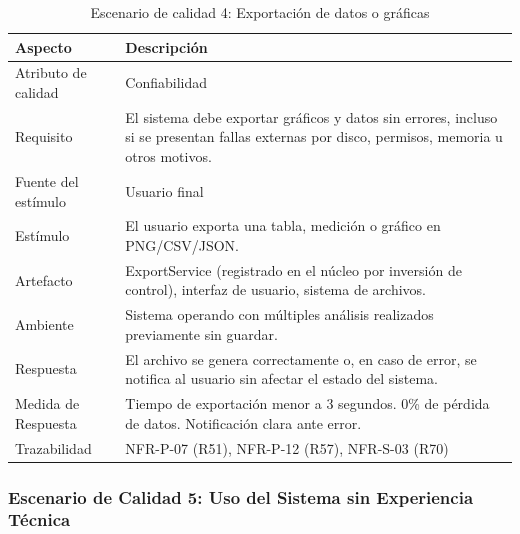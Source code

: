 \documentclass[11pt,a4paper]{article}
\DeclareRobustCommand{\_}{\textunderscore\allowbreak}
\begin{document}
\begin{table}[H]
\centering
\caption{Escenario de calidad 4: Exportación de datos o gráficas}
\label{tab:escenario4}
\begin{tabularx}{\textwidth}{|l|X|}
\hline
\textbf{Aspecto} & \textbf{Descripción} \\
\hline
Atributo de calidad & Confiabilidad \\
\hline
Requisito & El sistema debe exportar gráficos y datos sin errores, incluso si se presentan fallas externas por disco, permisos, memoria u otros motivos. \\
\hline
Fuente del estímulo & Usuario final \\
\hline
Estímulo & El usuario exporta una tabla, medición o gráfico en PNG/CSV/JSON. \\
\hline
Artefacto & ExportService (registrado en el núcleo por inversión de control), interfaz de usuario, sistema de archivos. \\
\hline
Ambiente & Sistema operando con múltiples análisis realizados previamente sin guardar. \\
\hline
Respuesta & El archivo se genera correctamente o, en caso de error, se notifica al usuario sin afectar el estado del sistema. \\
\hline
Medida de Respuesta & Tiempo de exportación menor a 3 segundos. 0\% de pérdida de datos. Notificación clara ante error. \\
\hline
Trazabilidad & NFR-P-07 (R51), NFR-P-12 (R57), NFR-S-03 (R70) \\
\hline
\end{tabularx}
\end{table}

\subsubsection{Escenario de Calidad 5: Uso del Sistema sin Experiencia Técnica}
\end{document}
